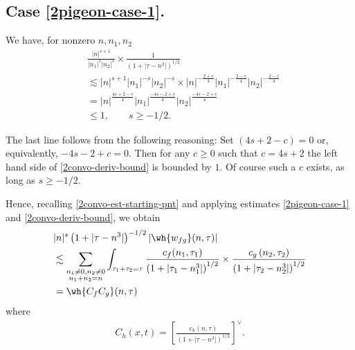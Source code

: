 \subsection{Case \eqref{2pigeon-case-1}.} 
We have, for nonzero $ n, n_1, n_2 $
%
\begin{equation}
	\label{2convo-deriv-bound}
	\begin{split}
		& \frac{|n|^{s+1}}{|n_1|^s 
		| n_2|^s}
		\times
		\frac{1}{(1 + | \tau -n^{3} |)^{1/2}}
		\\
		& \lesssim | n |^{s+1}| n_1 |^{-s}| n_2 |^{-s} \times | n
		|^{-\frac{2+c}{4}}| n_1 |^{-\frac{2-c}{4}}| n_2 |^{-\frac{2-c}{4}} 
		\\
		& = | n |^{\frac{4s +2 -c}{4}} | n_1 |^{\frac{-4s -2 +c}{4}} | n_2
		|^{\frac{-4s -2 +c}{4}}
		\\
		& \le 1, \qquad s \ge -1/2.
	\end{split}  
\end{equation}
%
%
\begin{remark}
	\label{2rem:s-val}
	The last line follows from the following reasoning: Set $(4s + 2 -c) = 0$
or, equivalently, $-4s -2 +c = 0$. Then for any $c \ge 0$ such that $c = 4s+2$
the left hand side of
\eqref{2convo-deriv-bound} is bounded by $1$. Of course such a $c$ exists, as long as $s \ge -1/2$. 
\end{remark}
%
%
%
Hence, recalling \eqref{2convo-est-starting-pnt} and applying estimates 
\eqref{2pigeon-case-1} and \eqref{2convo-deriv-bound}, we obtain
%
%
\begin{equation}
	\label{2non-lin-rep-with-bound}
	\begin{split}
		& |n|^s \left( 1 + | \tau - n^3 | \right)^{-1/2} | 
		\wh{w_{fg}}(n, \tau) | 
		\\
		& \lesssim \sum_{\substack{n_1 \neq0, n_2 \neq 0 \\n_1 + n_2 =n}} \int_{\tau_1 + \tau_2 = \tau}\frac{c_f(n_1, \tau_1)}{\left( 1 + | 
		\tau_1 -  n_1^3| \right)^{1/2}}
		\times \frac{c_g\left( n_2, \tau_2\right)}{\left( 1 + | \tau_2 -n_2^3|
		\right)^{1/2}}
		\\
		& = \wh{C_f C_g}(n, \tau)
	\end{split}
\end{equation}
%
%
where
\begin{equation*}
	\begin{split}
		C_h(x,t) =
		\left[ \frac{c_h(n, \tau)}{\left( 1 + | \tau - n^3 | 
		\right)^{1/2}}\right]^\vee.	
	\end{split}
\end{equation*}

